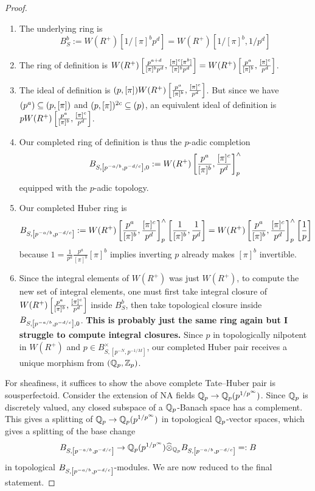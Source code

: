 \documentclass{article}
\begin{document}
\begin{proof}
\begin{enumerate}
    \item The underlying ring is 
    \[
      B_S^b := W(R^+)[1 / [\pi]^b p^d] = W(R^+)[1 / [\pi]^b , 1 / p^d]
    \]

    \item The ring of definition is
    $W(R^+)\left[\frac{p^{a + d}}{[\pi]^b p^d} , 
      \frac{[\pi]^{c}[\pi^{b}]}{[\pi]^b p^d}\right]
    = W(R^+)\left[\frac{p^a}{[\pi]^b} , \frac{[\pi]^c}{p^d}\right]$.

    \item The ideal of definition is
    $(p , [\pi]) W(R^+)\left[\frac{p^a}{[\pi]^b} , \frac{[\pi]^c}{p^d}\right]$.
    But since we have 
    $(p^a) \subseteq (p , [\pi])$
    and $(p , [\pi])^{2 c} \subseteq (p)$,
    an equivalent ideal of definition is 
    $pW(R^+)\left[\frac{p^a}{[\pi]^b} , \frac{[\pi]^c}{p^d}\right]$.

    \item Our completed ring of definition is
    thus the $p$-adic completion \[
      B_{S , \left[p^{- a / b} , p^{- d / c}\right], 0} := 
      W(R^+)\left[\frac{p^a}{[\pi]^b} , \frac{[\pi]^c}{p^d}\right]^\wedge_p
    \]
    equipped with the $p$-adic topology.

    \item Our completed Huber ring is \[
      B_{S , \left[p^{- a / b} , p^{- d / c}\right]} := 
        W(R^+)\left[\frac{p^a}{[\pi]^b} , \frac{[\pi]^c}{p^d}\right]^\wedge_p
        \left[\frac{1}{[\pi]^b} , \frac{1}{p^d}\right]
      = W(R^+)\left[\frac{p^a}{[\pi]^b} , \frac{[\pi]^c}{p^d}\right]^\wedge_p
      \left[\frac{1}{p}\right]
    \]
    because $1 = \frac{1}{p^a} \frac{p^a}{[\pi]^b} [\pi]^b$
    implies inverting $p$ already makes $[\pi]^b$ invertible.

    \item Since the integral elements of $W(R^+)$ was 
    just $W(R^+)$,
    to compute the new set of integral elements,
    one must first take integral closure of 
    $W(R^+)\left[\frac{p^a}{[\pi]^b} , \frac{[\pi]^c}{p^d}\right]$
    inside $B^b_S$,
    then take topological closure
    inside $B_{S , \left[p^{- a / b} , p^{- d / c}\right], 0}$.
    \textbf{This is probably just the same ring again
    but I struggle to compute integral closures.}
    Since $p$ in topologically nilpotent in $W(R^+)$
    and $p \in B_{S , [p^{- N} , p^{- 1 / M}]}^\times$,
    our completed Huber pair receives a unique morphism
    from $(\mathbb{Q}_p , \mathbb{Z}_p)$.
  \end{enumerate}
  For sheafiness,
  it suffices to show the above complete Tate--Huber pair is sousperfectoid.
  Consider the extension of NA fields $\mathbb{Q}_p \to \mathbb{Q}_p(p^{1 / p^\infty})$.
  Since $\mathbb{Q}_p$ is discretely valued,
  any closed subspace of a $\mathbb{Q}_p$-Banach space has a complement.
  \cite[Prop. 10.5]{Sch13}
  This gives a splitting of $\mathbb{Q}_p \to \mathbb{Q}_p(p^{1 / p^\infty})$
  in topological $\mathbb{Q}_p$-vector spaces,
  which gives a splitting of the base change \[
    B_{S , \left[p^{- a / b} , p^{- d / c}\right]} \to 
    \mathbb{Q}_p(p^{1 / p^\infty}) \widehat{\otimes}_{\mathbb{Q}_p} 
    B_{S , \left[p^{- a / b} , p^{- d / c}\right]}
    =: B
  \]
  in topological $B_{S , \left[p^{- a / b} , p^{- d / c}\right]}$-modules.
  We are now reduced to the final statement.
  

\end{proof}
\end{document}
